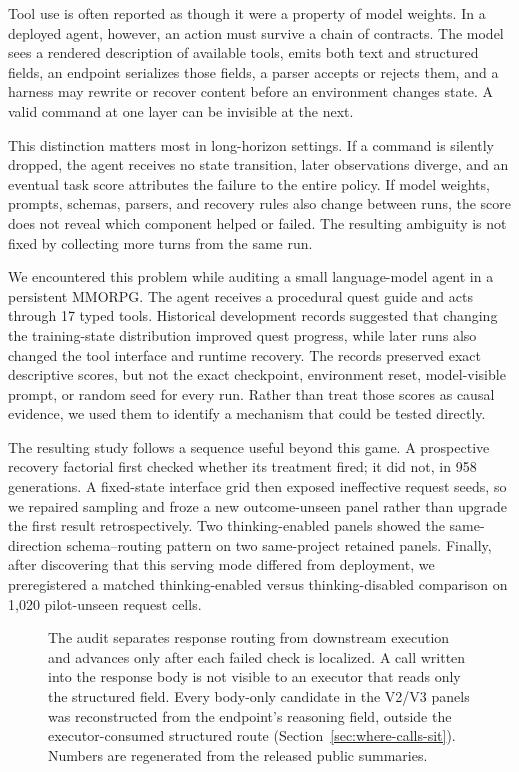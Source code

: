 \documentclass[10pt]{article}
\begin{document}
Tool use is often reported as though it were a property of model weights. In a
deployed agent, however, an action must survive a chain of contracts. The model
sees a rendered description of available tools, emits both text and structured
fields, an endpoint serializes those fields, a parser accepts or rejects them,
and a harness may rewrite or recover content before an environment changes
state. A valid command at one layer can be invisible at the next.

This distinction matters most in long-horizon settings. If a command is silently
dropped, the agent receives no state transition, later observations diverge,
and an eventual task score attributes the failure to the entire policy. If
model weights, prompts, schemas, parsers, and recovery rules also change between
runs, the score does not reveal which component helped or failed. The resulting
ambiguity is not fixed by collecting more turns from the same run.

We encountered this problem while auditing a small language-model agent in a
persistent MMORPG. The agent receives a procedural quest guide and acts through
17 typed tools. Historical development records suggested that changing the
training-state distribution improved quest progress, while later runs also
changed the tool interface and runtime recovery. The records preserved exact
descriptive scores, but not the exact checkpoint, environment reset,
model-visible prompt, or random seed for every run. Rather than treat those
scores as causal evidence, we used them to identify a mechanism that could be
tested directly.

The resulting study follows a sequence useful beyond this game. A prospective
recovery factorial first checked whether its treatment fired; it did not, in
958 generations. A fixed-state interface grid then exposed ineffective request
seeds, so we repaired sampling and froze a new outcome-unseen panel rather than
upgrade the first result retrospectively. Two thinking-enabled panels showed
the same-direction schema--routing pattern on two same-project retained panels.
Finally, after discovering that this serving mode differed from deployment, we
preregistered a matched
thinking-enabled versus thinking-disabled comparison on 1,020 pilot-unseen
request cells.

\begin{figure}[t]
\centering
\AuditOverviewFigure
\caption{The audit separates response routing from downstream execution and
advances only after each failed check is localized. A call written into the
response body is not visible to an executor that reads only the structured
field. Every body-only candidate in the V2/V3 panels was reconstructed from the
endpoint's reasoning field, outside the executor-consumed structured route
(Section~\ref{sec:where-calls-sit}). Numbers are regenerated from the released
public summaries.}
\label{fig:routing}
\end{figure}
\end{document}
